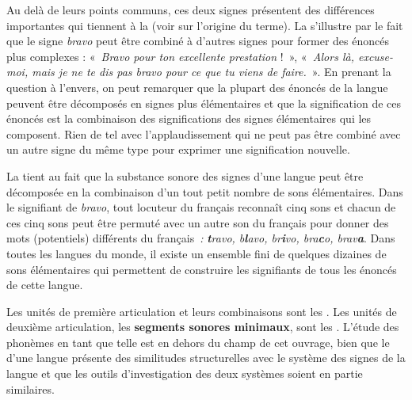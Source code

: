 Au delà de leurs points communs, ces deux signes présentent des différences importantes qui tiennent à la  (voir  sur l’origine du terme). La  s’illustre par le fait que le signe \textit{bravo} peut être combiné à d’autres signes pour former des énoncés plus complexes : «~\textit{Bravo pour ton excellente prestation} !~», «~\textit{Alors là, excuse-moi, mais je ne te dis pas bravo pour ce que tu viens de faire.}~». En prenant la question à l’envers, on peut remarquer que la plupart des énoncés de la langue peuvent être décomposés en signes plus élémentaires et que la signification de ces énoncés est la combinaison des significations des signes élémentaires qui les composent. Rien de tel avec l’applaudissement qui ne peut pas être combiné avec un autre signe du même type pour exprimer une signification nouvelle.

La  tient au fait que la substance sonore des signes d’une langue peut être décomposée en la combinaison d’un tout petit nombre de sons élémentaires. Dans le signifiant de \textit{bravo}, tout locuteur du français reconnaît cinq sons et chacun de ces cinq sons peut être permuté avec un autre son du français pour donner des mots (potentiels) différents du français~\textit{:} \textbf{\textit{t}}\textit{ravo, b}\textbf{\textit{l}}\textit{avo, br}\textbf{\textit{i}}\textit{vo, bra}\textbf{\textit{c}}\textit{o, brav}\textbf{\textit{a}}. Dans toutes les langues du monde, il existe un ensemble fini de quelques dizaines de sons élémentaires qui permettent de construire les signifiants de tous les énoncés de cette langue.

Les unités de première articulation et leurs combinaisons sont les . Les unités de deuxième articulation, les \textbf{segments sonores minimaux}, sont les . L’étude des phonèmes en tant que telle est en dehors du champ de cet ouvrage, bien que le  d’une langue présente des similitudes structurelles avec le système des signes de la langue et que les outils d’investigation des deux systèmes soient en partie similaires.

